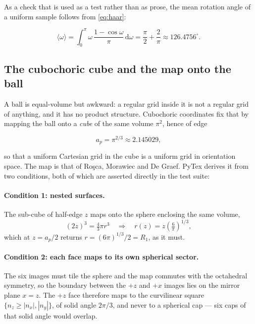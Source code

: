 As a check that is used as a test rather than as prose, the mean rotation angle of a uniform
sample follows from \eqref{eq:haar}:

\begin{equation}
  \langle \omega \rangle = \int_{0}^{\pi} \omega\,\frac{1-\cos\omega}{\pi}\,\mathrm{d}\omega
  = \frac{\pi}{2} + \frac{2}{\pi} \approx 126.4756^{\circ}.
  \label{eq:meanangle}
\end{equation}

\subsection{The cubochoric cube and the map onto the ball}

A ball is equal-volume but awkward: a regular grid inside it is not a regular grid of
anything, and it has no product structure. Cubochoric coordinates fix that by mapping the
ball onto a \emph{cube} of the same volume \(\pi^{2}\), hence of edge

\begin{equation}
  a_{p} = \pi^{2/3} \approx 2.145029,
\end{equation}

so that a uniform Cartesian grid in the cube is a uniform grid in orientation space. The map
is that of Ro\c{s}ca, Morawiec and De Graef. PyTex derives it from two conditions, both of
which are asserted directly in the test suite:

\paragraph{Condition 1: nested surfaces.} The sub-cube of half-edge \(z\) maps onto the sphere
enclosing the same volume,
\begin{equation}
  (2z)^{3} = \tfrac{4}{3}\pi r^{3}
  \quad\Longrightarrow\quad
  r(z) = z\left(\tfrac{6}{\pi}\right)^{1/3},
  \label{eq:nested}
\end{equation}
which at \(z = a_{p}/2\) returns \(r = (6\pi)^{1/3}/2 = R_{1}\), as it must.

\paragraph{Condition 2: each face maps to its own spherical sector.} The six images must tile
the sphere and the map commutes with the octahedral symmetry, so the boundary between the
\(+z\) and \(+x\) images lies on the mirror plane \(x = z\). The \(+z\) face therefore maps to
the curvilinear square \(\{n_{z} \ge |n_{x}|, |n_{y}|\}\), of solid angle \(2\pi/3\), and
never to a spherical cap --- six caps of that solid angle would overlap.

